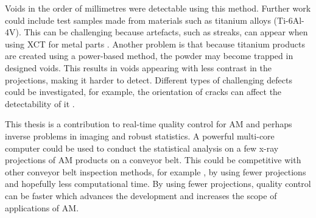 \documentclass[12pt, a4paper, twoside]{memoir}
\begin{document}
Voids in the order of millimetres were detectable using this method. Further work could include test samples made from materials such as titanium alloys (Ti-6Al-4V). This can be challenging because artefacts, such as streaks, can appear when using XCT for metal parts \citep{deman1998metal, nawaz2014metal}. Another problem is that because titanium products are created using a power-based method, the powder may become trapped \citep{brierley2018optimized} in designed voids. This results in voids appearing with less contrast in the projections, making it harder to detect. Different types of challenging defects could be investigated, for example, the orientation of cracks can affect the detectability of it \citep{wooldridge1997demonstrating}.

This thesis is a contribution to real-time quality control for AM and perhaps inverse problems in imaging \citep{bertero1998introduction} and robust statistics. A powerful multi-core computer could be used to conduct the statistical analysis on a few x-ray projections of AM products on a conveyor belt. This could be competitive with other conveyor belt inspection methods, for example \cite{warnett2016towards}, by using fewer projections and hopefully less computational time. By using fewer projections, quality control can be faster which advances the development and increases the scope of applications of AM.




\begin{appendices}

\end{appendices}
\end{document}

